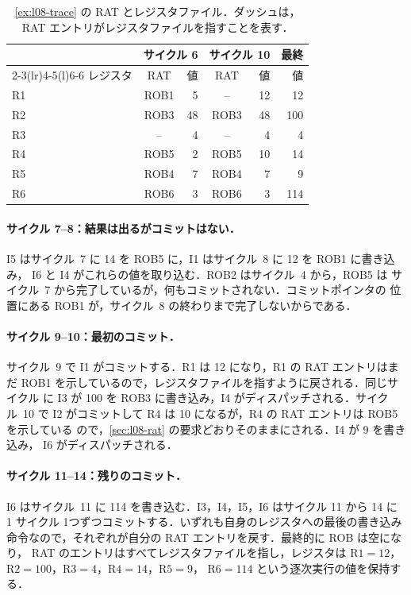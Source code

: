 \documentclass[../main.tex]{subfiles}
\begin{document}
\begin{table}[htbp]
  \centering\small
  \caption{\cref{ex:l08-trace} の RAT とレジスタファイル．ダッシュは，RAT
    エントリがレジスタファイルを指すことを表す．}
  \label{tab:l08-rat-state}
  \begin{tabular}{@{}lcrcrr@{}}
    \toprule
    & \multicolumn{2}{c}{サイクル 6} & \multicolumn{2}{c}{サイクル 10} & 最終 \\
    \cmidrule(lr){2-3}\cmidrule(lr){4-5}\cmidrule(l){6-6}
    レジスタ & RAT & 値 & RAT & 値 & 値 \\
    \midrule
    R1 & ROB1 & 5  & --   & 12 & 12  \\
    R2 & ROB3 & 48 & ROB3 & 48 & 100 \\
    R3 & --   & 4  & --   & 4  & 4   \\
    R4 & ROB5 & 2  & ROB5 & 10 & 14  \\
    R5 & ROB4 & 7  & ROB4 & 7  & 9   \\
    R6 & ROB6 & 3  & ROB6 & 3  & 114 \\
    \bottomrule
  \end{tabular}
\end{table}

\paragraph{サイクル 7--8：結果は出るがコミットはない．}
I5 はサイクル~7 に 14 を ROB5 に，I1 はサイクル~8 に 12 を ROB1 に書き込み，
I6 と I4 がこれらの値を取り込む．ROB2 はサイクル~4 から，ROB5 は
サイクル~7 から完了しているが，何もコミットされない．コミットポインタの
位置にある ROB1 が，サイクル~8 の終わりまで完了しないからである．

\paragraph{サイクル 9--10：最初のコミット．}
サイクル~9 で I1 がコミットする．R1 は 12 になり，R1 の RAT エントリはまだ
ROB1 を示しているので，レジスタファイルを指すように戻される．同じサイクル
に I3 が 100 を ROB3 に書き込み，I4 がディスパッチされる．サイクル~10 で
I2 がコミットして R4 は 10 になるが，R4 の RAT エントリは ROB5 を示している
ので，\cref{sec:l08-rat} の要求どおりそのままにされる．I4 が 9 を書き込み，
I6 がディスパッチされる．

\paragraph{サイクル 11--14：残りのコミット．}
I6 はサイクル~11 に 114 を書き込む．I3，I4，I5，I6 はサイクル 11 から 14 に
1 サイクル 1つずつコミットする．いずれも自身のレジスタへの最後の書き込み
命令なので，それぞれが自分の RAT エントリを戻す．最終的に ROB は空になり，
RAT のエントリはすべてレジスタファイルを指し，レジスタは $\text{R1}=12$，
$\text{R2}=100$，$\text{R3}=4$，$\text{R4}=14$，$\text{R5}=9$，
$\text{R6}=114$ という逐次実行の値を保持する．
\end{document}
